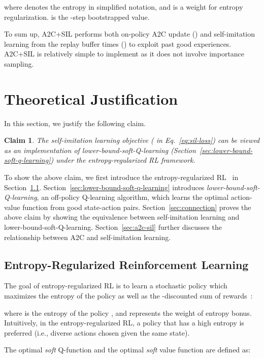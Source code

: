 \documentclass{article}
\newtheorem*{claim}{Claim}
\newcommand{\cutsectionup}{\vspace*{-0.08in}}\newcommand{\cutsectiondown}{\vspace*{-0.05in}}
\newcommand{\cutsubsectionup}{\vspace*{-0.05in}}\newcommand{\cutsubsectiondown}{\vspace*{-0.05in}}
\begin{document}
where  denotes the entropy in simplified notation, and  is a weight for entropy regularization.  is the -step bootstrapped value. 

To sum up, A2C+SIL performs both on-policy A2C update () and self-imitation learning from the replay buffer  times () to exploit past good experiences. A2C+SIL is relatively simple to implement as it does not involve importance sampling.

\cutsectionup
\section{Theoretical Justification} \label{sec:theory}
\cutsectiondown
In this section, we justify the following claim.
\begin{claim}
The self-imitation learning objective ( in Eq.~\ref{eq:sil-loss}) can be viewed as an implementation of lower-bound-soft-Q-learning (Section~\ref{sec:lower-bound-soft-q-learning}) under the entropy-regularized RL framework. 
\end{claim}
To show the above claim, we first introduce the entropy-regularized RL~\citep{Haarnoja2017ReinforcementLW} in Section~\ref{sec:background}. Section~\ref{sec:lower-bound-soft-q-learning} introduces \textit{lower-bound-soft-Q-learning}, an off-policy Q-learning algorithm, which learns the optimal action-value function from good state-action pairs. Section~\ref{sec:connection} proves the above claim by showing the equivalence between self-imitation learning and lower-bound-soft-Q-learning. Section~\ref{sec:a2c-sil} further discusses the relationship between A2C and self-imitation learning.


\cutsubsectionup
\subsection{Entropy-Regularized Reinforcement Learning} \label{sec:background}
\cutsubsectiondown
The goal of entropy-regularized RL is to learn a stochastic policy which maximizes the entropy of the policy as well as the -discounted sum of rewards~\citep{Haarnoja2017ReinforcementLW,Ziebart2008MaximumEI}:

where  is the entropy of the policy , and  represents the weight of entropy bonus. Intuitively, in the entropy-regularized RL, a policy that has a high entropy is preferred (i.e., diverse actions chosen given the same state).

The optimal \textit{soft} Q-function and the optimal \textit{soft} value function are defined as:
\end{document}
